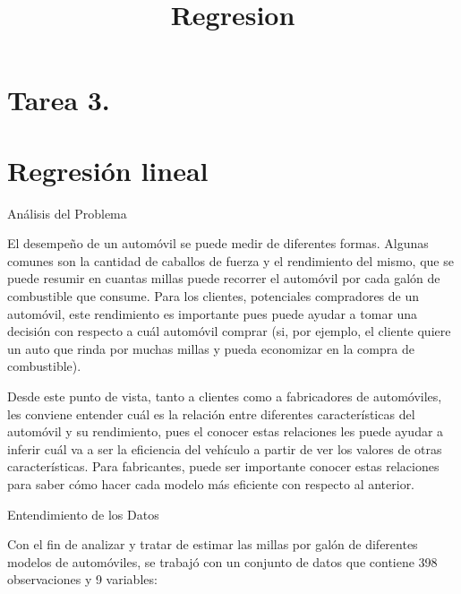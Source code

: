 \documentclass[]{article}
\title{Regresion}
\author{}
\date{}
\begin{document}
\maketitle

\hypertarget{tarea-3.}{%
\section{Tarea 3.}\label{tarea-3.}}

\hypertarget{regresion-lineal}{%
\section{Regresión lineal}\label{regresion-lineal}}

Análisis del Problema

El desempeño de un automóvil se puede medir de diferentes formas.
Algunas comunes son la cantidad de caballos de fuerza y el rendimiento
del mismo, que se puede resumir en cuantas millas puede recorrer el
automóvil por cada galón de combustible que consume. Para los clientes,
potenciales compradores de un automóvil, este rendimiento es importante
pues puede ayudar a tomar una decisión con respecto a cuál automóvil
comprar (si, por ejemplo, el cliente quiere un auto que rinda por muchas
millas y pueda economizar en la compra de combustible).

Desde este punto de vista, tanto a clientes como a fabricadores de
automóviles, les conviene entender cuál es la relación entre diferentes
características del automóvil y su rendimiento, pues el conocer estas
relaciones les puede ayudar a inferir cuál va a ser la eficiencia del
vehículo a partir de ver los valores de otras características. Para
fabricantes, puede ser importante conocer estas relaciones para saber
cómo hacer cada modelo más eficiente con respecto al anterior.

Entendimiento de los Datos

Con el fin de analizar y tratar de estimar las millas por galón de
diferentes modelos de automóviles, se trabajó con un conjunto de datos
que contiene 398 observaciones y 9 variables:
\end{document}
